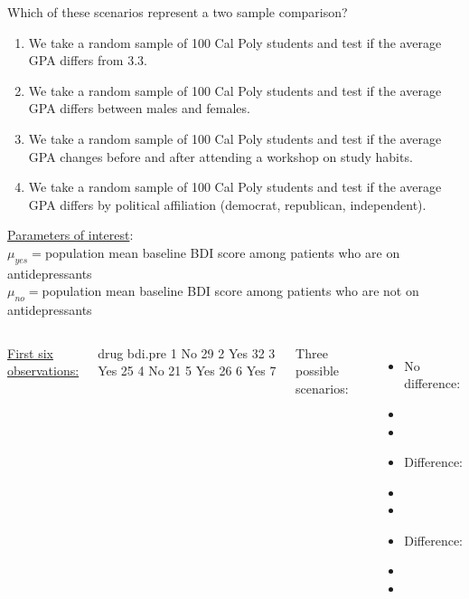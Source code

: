 \begin{frame}
\begin{clicker}{Which of these scenarios represent a two sample comparison?}
\begin{enumerate}
    \item
    We take a random sample of 100 Cal Poly students and test if the average GPA differs from 3.3.
    \item
    We take a random sample of 100 Cal Poly students and test if the average GPA differs between males and females.
    \item
    We take a random sample of 100 Cal Poly students and test if the average GPA changes before and after attending a workshop on study habits.
    \item
    We take a random sample of 100 Cal Poly students and test if the average GPA differs by political affiliation (democrat, republican, independent).
\end{enumerate}
\end{clicker}
\end{frame}



\begin{frame}[fragile]
\underline{Parameters of interest}: \\
$\mu_{yes}= $population mean baseline BDI score among patients who are on antidepressants \\
$\mu_{no}= $population mean baseline BDI score among patients who are not on antidepressants \\
\vskip20pt
\begin{columns}
\underline{First six observations:}
\begin{lcverbatim}
  drug bdi.pre
1   No      29
2  Yes      32
3  Yes      25
4   No      21
5  Yes      26
6  Yes       7
\end{lcverbatim}
Three possible scenarios:
\begin{itemize}
\item
No difference:
\item[]
\item[]
\item
Difference:
\item[]
\item[]
\item
Difference:
\item[]
\item[]
\end{itemize}
\end{columns}
\end{frame}

